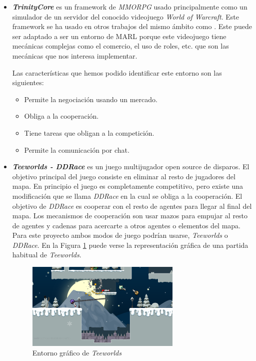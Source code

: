 \begin{itemize}
	\item \textbf{\textit{TrinityCore}} \cite{trinity-repo} es un framework de \textit{MMORPG} usado principalmente como un simulador de un servidor del conocido videojuego \textit{World of Warcraft}. Este framework se ha usado en otros trabajos del mismo ámbito como \cite {wow-upc}. Este puede ser adaptado a ser un entorno de MARL porque este videojuego tiene mecánicas complejas como el comercio, el uso de roles, etc. que son las mecánicas que nos interesa implementar.

	      Las características que hemos podido identificar este entorno son las siguientes:
	      \begin{itemize}
		      \item Permite la negociación usando un mercado.
		      \item Obliga a la cooperación.
		      \item Tiene tareas que obligan a la competición.
		      \item Permite la comunicación por chat.
	      \end{itemize}

	\item \textbf{\textit{Teeworlds - DDRace}} \cite{teeworlds} es un juego multijugador open source de disparos. El objetivo principal del juego consiste en eliminar al resto de jugadores del mapa. En principio el juego es completamente competitivo, pero existe una modificación que se llama \textit{DDRace} en la cual se obliga a la cooperación. El objetivo de \textit{DDRace} es cooperar con el resto de agentes para llegar al final del mapa. Los mecanismos de cooperación son usar mazos para empujar al resto de agentes y cadenas para acercarte a otros agentes o elementos del mapa. Para este proyecto ambos modos de juego podrían usarse, \textit{Teeworlds} o \textit{DDRace}. En la Figura \ref {fig:teeworlds} puede verse la representación gráfica de una partida habitual de \textit{Teeworlds}.

	      \begin{figure}[ht]
		      \centering
		      \includegraphics[width=0.7\textwidth]{img/screenshot_winter (1).png}
		      \caption{Entorno gráfico de \textit{Teeworlds} \cite{teeworlds}}
		      \label{fig:teeworlds}
	      \end{figure}


\end{itemize}
